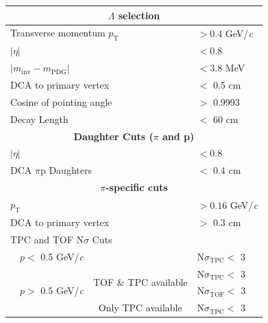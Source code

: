 \documentclass[ALICE,manyauthors]{cernphprep}
\newcommand{\Lam}{$\Lambda$\xspace}
\begin{document}
\begin{table}[htbp]
 \centering 
  \begin{tabular}{lc|c|l}
   \hline  
   \multicolumn{4}{c}{\textbf{\Lam selection}} \\
   \hline
   \multicolumn{3}{l|}{Transverse momentum $p_{\mathrm{T}}$} & $> 0.4$ GeV/\textit{c} \\
   \hline
   \multicolumn{3}{l|}{$|\eta|$} & $< 0.8$ \\
   \hline
   \multicolumn{3}{l|}{$|m_{\mathrm{inv}} - m_{\mathrm{PDG}}|$} & $< 3.8$ MeV \\ 
   \hline
   \multicolumn{3}{l|}{DCA to primary vertex} & $<$ 0.5 cm \\
   \hline
   \multicolumn{3}{l|}{Cosine of pointing angle} & $>$ 0.9993 \\
   \hline
   \multicolumn{3}{l|}{Decay Length} & $<$ 60 cm \\
   \hline
   
   
   \multicolumn{4}{c}{\textbf{Daughter Cuts ($\pi$ and p)}} \\
   \hline
   \multicolumn{3}{l|}{$|\eta|$} &  $< 0.8$ \\
   \hline
   \multicolumn{3}{l|}{DCA $\pi$p Daughters} & $<$ 0.4 cm \\
   \hline
   
   
   \multicolumn{4}{c}{\textbf{$\pi$-specific cuts}} \\
   \hline
   \multicolumn{3}{l|}{$p_{\mathrm{T}}$} & $> 0.16$ GeV/\textit{c} \\
   \hline
   \multicolumn{3}{l|}{DCA to primary vertex} & $>$ 0.3 cm \\
   \hline
   \multicolumn{4}{l}{TPC and TOF N$\sigma$ Cuts} \\
    & \multicolumn{1}{c}{$p <$ 0.5 GeV/\textit{c}} &  & N$\sigma_{\mathrm{TPC}} <$ 3 \\
   \cline{2-4}
    & \multicolumn{1}{c}{\multirow{3}{*}{$p >$ 0.5 GeV/\textit{c}}} &  \multirow{2}{*}{TOF \& TPC available} & N$\sigma_{\mathrm{TPC}} <$ 3 \\
    & \multicolumn{2}{c|}{} & N$\sigma_{\mathrm{TOF}} <$ 3 \\
   \cline{3-4}
    & \multicolumn{1}{c}{} & Only TPC available & N$\sigma_{\mathrm{TPC}} <$ 3 \\
   \hline
   

\end{tabular}
\end{table}
\end{document}

